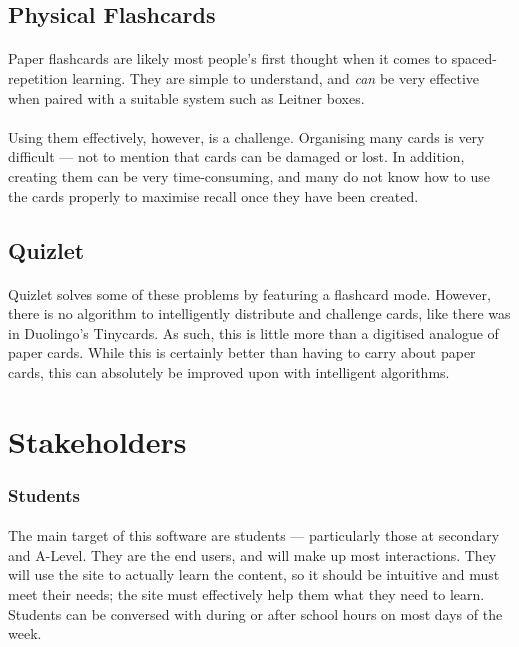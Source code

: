 \documentclass{report}
\begin{document}
\subsection{Physical Flashcards}
\paragraph{}
Paper flashcards are likely most people's first thought when it comes to spaced-repetition learning. They are simple to understand, and \emph{can} be very effective when paired with a suitable system such as Leitner boxes.

\paragraph{}
Using them effectively, however, is a challenge. Organising many cards is very difficult — not to mention that cards can be damaged or lost. In addition, creating them can be very time-consuming, and many do not know how to use the cards properly to maximise recall once they have been created.

\subsection{Quizlet}
\paragraph{}
Quizlet solves some of these problems by featuring a flashcard mode. However, there is no algorithm to intelligently distribute and challenge cards, like there was in Duolingo's Tinycards. As such, this is little more than a digitised analogue of paper cards. While this is certainly better than having to carry about paper cards, this can absolutely be improved upon with intelligent algorithms.

\section{Stakeholders}

\subsubsection{Students}
\paragraph{}
The main target of this software are students — particularly those at secondary and A-Level. They are the end users, and will make up most interactions. They will use the site to actually learn the content, so it should be intuitive and must meet their needs; the site must effectively help them what they need to learn. Students can be conversed with during or after school hours on most days of the week.
\end{document}
